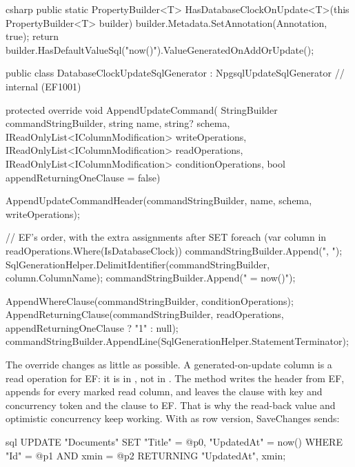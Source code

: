 \begin{sourcecode}{csharp}
public static PropertyBuilder<T> HasDatabaseClockOnUpdate<T>(this PropertyBuilder<T> builder)
{
    builder.Metadata.SetAnnotation(Annotation, true);
    return builder.HasDefaultValueSql("now()").ValueGeneratedOnAddOrUpdate();
}

public class DatabaseClockUpdateSqlGenerator : NpgsqlUpdateSqlGenerator   // internal (EF1001)
{
    protected override void AppendUpdateCommand(
        StringBuilder commandStringBuilder,
        string name,
        string? schema,
        IReadOnlyList<IColumnModification> writeOperations,
        IReadOnlyList<IColumnModification> readOperations,
        IReadOnlyList<IColumnModification> conditionOperations,
        bool appendReturningOneClause = false)
    {
        AppendUpdateCommandHeader(commandStringBuilder, name, schema, writeOperations);

        // EF's order, with the extra assignments after SET
        foreach (var column in readOperations.Where(IsDatabaseClock))
        {
            commandStringBuilder.Append(", ");
            SqlGenerationHelper.DelimitIdentifier(commandStringBuilder, column.ColumnName);
            commandStringBuilder.Append(" = now()");
        }

        AppendWhereClause(commandStringBuilder, conditionOperations);
        AppendReturningClause(commandStringBuilder, readOperations,
            appendReturningOneClause ? "1" : null);
        commandStringBuilder.AppendLine(SqlGenerationHelper.StatementTerminator);
    }
}
\end{sourcecode}

The override changes as little as possible. A generated-on-update column is a read operation for
EF: it is in , not in . The method writes the header from EF, appends
 for every marked read column, and leaves the  clause with
key and concurrency token and the  clause to EF. That is why the read-back value
and optimistic concurrency keep working. With  as row version, SaveChanges sends:

\begin{sourcecode}{sql}
UPDATE "Documents" SET "Title" = @p0, "UpdatedAt" = now()
WHERE "Id" = @p1 AND xmin = @p2
RETURNING "UpdatedAt", xmin;
\end{sourcecode}

